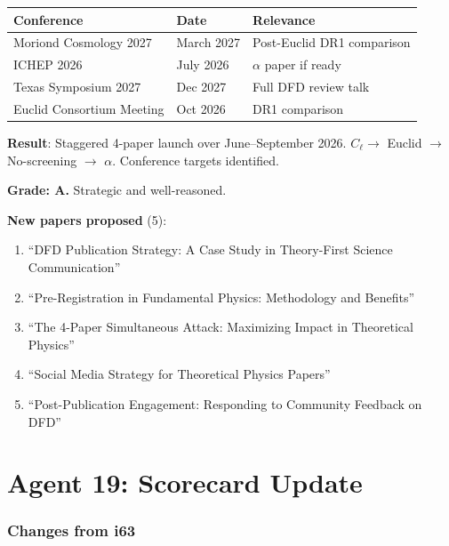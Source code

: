 \documentclass[11pt,a4paper]{article}
\begin{document}
\begin{center}
\begin{tabular}{lll}
\toprule
\textbf{Conference} & \textbf{Date} & \textbf{Relevance} \\
\midrule
Moriond Cosmology 2027 & March 2027 & Post-Euclid DR1 comparison \\
ICHEP 2026 & July 2026 & $\alpha$ paper if ready \\
Texas Symposium 2027 & Dec 2027 & Full DFD review talk \\
Euclid Consortium Meeting & Oct 2026 & DR1 comparison \\
\bottomrule
\end{tabular}
\end{center}

\begin{tcolorbox}[colback=green!5!white, colframe=green!60!black, title={Agent 18: 3-Paper Launch Strategy COMPLETE}]
\textbf{Result}: Staggered 4-paper launch over June--September 2026. $C_\ell \to$ Euclid $\to$ No-screening $\to$ $\alpha$. Conference targets identified.

\textbf{Grade: A.} Strategic and well-reasoned.

\textbf{New papers proposed} (5):
\begin{enumerate}
\item ``DFD Publication Strategy: A Case Study in Theory-First Science Communication''
\item ``Pre-Registration in Fundamental Physics: Methodology and Benefits''
\item ``The 4-Paper Simultaneous Attack: Maximizing Impact in Theoretical Physics''
\item ``Social Media Strategy for Theoretical Physics Papers''
\item ``Post-Publication Engagement: Responding to Community Feedback on DFD''
\end{enumerate}
\end{tcolorbox}


\part{Agent 19: Scorecard Update}
\label{part:scorecard}

\section{Changes from i63}
\end{document}
